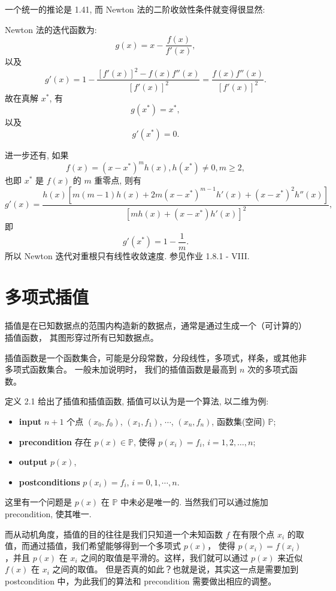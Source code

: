 \documentclass[a4paper]{ctexart}
\newcommand{\remark}[1]
{\noindent {\bf Remark {#1}}}
\begin{document}
一个统一的推论是 1.41, 而 Newton 法的二阶收敛性条件就变得很显然:

Newton 法的迭代函数为:
$$
g(x) = x - \frac{f(x)}{f'(x)},
$$
以及
$$
g'(x) = 1 - \frac{\left[f'(x)\right]^2 - f(x)f''(x)}{\left[f'(x)\right]^2}
= \frac{f(x)f''(x)}{\left[f'(x)\right]^2}.
$$
故在真解 $x^*$, 有
$$
g(x^*) = x^*, 
$$
以及
$$
g'(x^*) = 0.
$$

进一步还有, 如果
$$
f(x) = (x - x^*)^m h(x), h(x^*) \neq 0, m \geq 2,
$$
也即 $x^*$ 是 $f(x)$ 的 $m$ 重零点, 则有
$$
g'(x) = \frac{h(x)\left[m(m - 1)h(x) + 2m(x - x^*)^{m - 1}h'(x)
    + (x - x^*)^2h''(x)\right]}{\left[mh(x) + (x - x^*)h'(x)\right]^2},
$$
即
$$
g'(x^*) = 1 - \frac{1}{m}.
$$
所以 Newton 迭代对重根只有线性收敛速度. 参见作业 1.8.1 - VIII.

\section{多项式插值}

 插值是在已知数据点的范围内构造新的数据点，通常是通过生成一个（可计算的）插值函数，
其图形穿过所有已知数据点。

 插值函数是一个函数集合，可能是分段常数，分段线性，多项式，样条，或其他非多项式函数集合。 
一般未加说明时， 我们的插值函数是最高到 $n$ 次的多项式函数。

\remark{2.1} 定义 2.1 给出了插值和插值函数, 插值可以认为是一个算法, 以二维为例:
\begin{itemize}
\item {\bf input} $n + 1$ 个点 $(x_0, f_0)$, $(x_1, f_1)$, $\cdots$, $(x_n, f_n)$, 函数集(空间) $\mathbb{P}$;
\item {\bf precondition} 存在 $p(x) \in \mathbb{P}$, 使得 $p(x_i) = f_i$, $i = 1, 2, \ldots, n$;
\item {\bf output} $p(x)$,
\item {\bf postconditions}  $p(x_i) = f_i$, $i = 0, 1, \cdots, n$.
\end{itemize}
这里有一个问题是 $p(x)$ 在 $\mathbb{P}$ 中未必是唯一的. 当然我们可以通过施加 precondition, 使其唯一. 

而从动机角度，插值的目的往往是我们只知道一个未知函数 $f$ 在有限个点 $x_i$ 的取值，而通过插值，我们希望能够得到一个多项式 $p(x)$，
使得 $p(x_i) = f(x_i)$，并且 $p(x)$ 在 $x_i$ 之间的取值是平滑的。这样，我们就可以通过 $p(x)$ 来近似 $f(x)$ 在 $x_i$ 之间的取值。
但是否真的如此？也就是说，其实这一点是需要加到 postcondition 中，为此我们的算法和 precondition 需要做出相应的调整。
\end{document}
